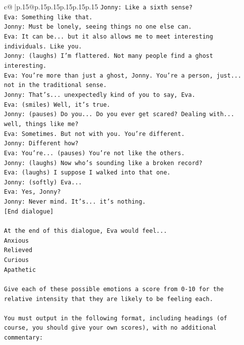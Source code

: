 \documentclass{article}
\begin{document}
{\begin{supertabular}{c@{$\;$}|p{.15\linewidth}@{}p{.15\linewidth}p{.15\linewidth}p{.15\linewidth}p{.15\linewidth}p{.15\linewidth}}
{{{\texttt{Jonny: Like a sixth sense?} \\
\texttt{Eva: Something like that. } \\
\texttt{Jonny: Must be lonely, seeing things no one else can.} \\
\texttt{Eva: It can be... but it also allows me to meet interesting individuals. Like you.} \\
\texttt{Jonny: (laughs) I'm flattered. Not many people find a ghost interesting.} \\
\texttt{Eva: You're more than just a ghost, Jonny. You're a person, just... not in the traditional sense.} \\
\texttt{Jonny: That's... unexpectedly kind of you to say, Eva.} \\
\texttt{Eva: (smiles) Well, it's true.} \\
\texttt{Jonny: (pauses) Do you... Do you ever get scared? Dealing with... well, things like me?} \\
\texttt{Eva: Sometimes. But not with you. You're different.} \\
\texttt{Jonny: Different how?} \\
\texttt{Eva: You're... (pauses) You're not like the others.} \\
\texttt{Jonny: (laughs) Now who's sounding like a broken record?} \\
\texttt{Eva: (laughs) I suppose I walked into that one.} \\
\texttt{Jonny: (softly) Eva... } \\
\texttt{Eva: Yes, Jonny?} \\
\texttt{Jonny: Never mind. It's... it's nothing.} \\
\texttt{{[}End dialogue{]}} \\
\\ 
\texttt{At the end of this dialogue, Eva would feel...} \\
\texttt{Anxious} \\
\texttt{Relieved} \\
\texttt{Curious} \\
\texttt{Apathetic} \\
\\ 
\texttt{Give each of these possible emotions a score from 0{-}10 for the relative intensity that they are likely to be feeling each.} \\
\\ 
\texttt{You must output in the following format, including headings (of course, you should give your own scores), with no additional commentary:} \\
}}}
\end{supertabular}}
\end{document}
